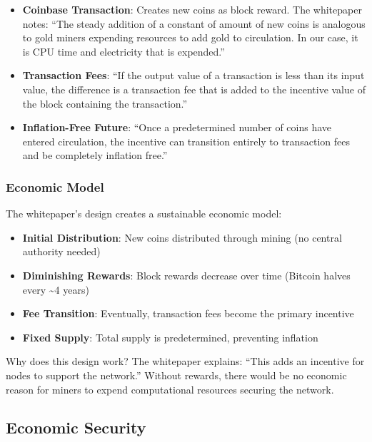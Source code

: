 \begin{itemize}
  \item \textbf{Coinbase Transaction}: Creates new coins as block reward. The whitepaper notes: ``The steady addition of a constant of amount of new coins is analogous to gold miners expending resources to add gold to circulation. In our case, it is CPU time and electricity that is expended.''

  \item \textbf{Transaction Fees}: ``If the output value of a transaction is less than its input value, the difference is a transaction fee that is added to the incentive value of the block containing the transaction.''

  \item \textbf{Inflation-Free Future}: ``Once a predetermined number of coins have entered circulation, the incentive can transition entirely to transaction fees and be completely inflation free.''
\end{itemize}

\subsubsection{Economic Model}

The whitepaper's design creates a sustainable economic model:

\begin{itemize}
  \item \textbf{Initial Distribution}: New coins distributed through mining (no central authority needed)
  \item \textbf{Diminishing Rewards}: Block rewards decrease over time (Bitcoin halves every \textasciitilde4 years)
  \item \textbf{Fee Transition}: Eventually, transaction fees become the primary incentive
  \item \textbf{Fixed Supply}: Total supply is predetermined, preventing inflation
\end{itemize}

Why does this design work? The whitepaper explains: ``This adds an incentive for nodes to support the network.'' Without rewards, there would be no economic reason for miners to expend computational resources securing the network.

\subsection{Economic Security}
\label{subsec:economic-security}

